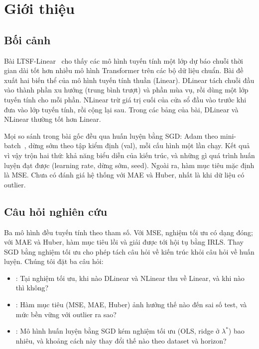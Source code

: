 \section{Giới thiệu}
\label{sec:intro}

\subsection{Bối cảnh}

Bài LTSF-Linear~\cite{zeng2023transformers} cho thấy các mô hình tuyến tính một lớp dự báo chuỗi thời gian dài tốt hơn nhiều mô hình Transformer trên các bộ dữ liệu chuẩn. Bài đề xuất hai biến thể của mô hình tuyến tính thuần (Linear). DLinear tách chuỗi đầu vào thành phần xu hướng (trung bình trượt) và phần mùa vụ, rồi dùng một lớp tuyến tính cho mỗi phần. NLinear trừ giá trị cuối của cửa sổ đầu vào trước khi đưa vào lớp tuyến tính, rồi cộng lại sau. Trong các bảng của bài, DLinear và NLinear thường tốt hơn Linear.

Mọi so sánh trong bài gốc đều qua huấn luyện bằng SGD: Adam theo mini-batch~\cite{kingma2015adam}, dừng sớm theo tập kiểm định (val), mỗi cấu hình một lần chạy. Kết quả vì vậy trộn hai thứ: khả năng biểu diễn của kiến trúc, và những gì quá trình huấn luyện đạt được (learning rate, dừng sớm, seed). Ngoài ra, hàm mục tiêu mặc định là MSE. Chưa có đánh giá hệ thống với MAE và Huber, nhất là khi dữ liệu có outlier.

\subsection{Câu hỏi nghiên cứu}

Ba mô hình đều tuyến tính theo tham số. Với MSE, nghiệm tối ưu có dạng đóng; với MAE và Huber, hàm mục tiêu lồi và giải được tới hội tụ bằng IRLS. Thay SGD bằng nghiệm tối ưu cho phép tách câu hỏi về kiến trúc khỏi câu hỏi về huấn luyện. Chúng tôi đặt ba câu hỏi:

\begin{itemize}
    \item {}: Tại nghiệm tối ưu, khi nào DLinear và NLinear thu về Linear, và khi nào thì không?
    \item {}: Hàm mục tiêu (MSE, MAE, Huber) ảnh hưởng thế nào đến sai số test, và mức bền vững với outlier ra sao?
    \item {}: Mô hình huấn luyện bằng SGD kém nghiệm tối ưu (OLS, ridge ở $\lambda^*$) bao nhiêu, và khoảng cách này thay đổi thế nào theo dataset và horizon?
\end{itemize}

